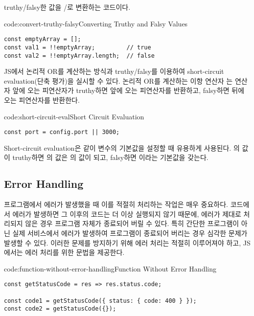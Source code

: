 \는 truthy/falsy한 값을 /로 변환하는 코드이다.

\begin{codeenv}{code:convert-truthy-falsy}{Converting Truthy and Falsy Values}\begin{verbatim}
const emptyArray = [];
const val1 = !!emptyArray;         // true
const val2 = !!emptyArray.length;  // false
\end{verbatim}
\end{codeenv}

JS에서 논리적 OR를 계산하는 방식과 truthy/falsy를 이용하여 short-circuit evaluation(단축 평가)을 실시할 수 있다. 논리적 OR를 계산하는 이항 연산자 \cd{||}는 연산자 앞에 오는 피연산자가 truthy하면 앞에 오는 피연산자를 반환하고, falsy하면 뒤에 오는 피연산자를 반환한다.

\begin{codeenv}{code:short-circuit-eval}{Short Circuit Evaluation}\begin{verbatim}
const port = config.port || 3000;
\end{verbatim}
\end{codeenv}

Short-circuit evaluation은 \과 같이 변수의 기본값을 설정할 때 유용하게 사용된다. 의 값이 truthy하면 의 값은 의 값이 되고, falsy하면 이라는 기본값을 갖는다.
\clearpage

\subsection*{Error Handling}

프로그램에서 에러가 발생했을 때 이를 적절히 처리하는 작업은 매우 중요하다. 코드에서 에러가 발생하면 그 이후의 코드는 더 이상 실행되지 않기 때문에, 에러가 제대로 처리되지 않은 경우 프로그램 자체가 종료되어 버릴 수 있다. 특히 간단한 프로그램이 아닌 실제 서비스에서 에러가 발생하여 프로그램이 종료되어 버리는 경우 심각한 문제가 발생할 수 있다. 이러한 문제를 방지하기 위해 에러 처리는 적절히 이루어져야 하고, JS에서는 에러 처리를 위한 문법을 제공한다.

\begin{codeenv}{code:function-without-error-handling}{Function Without Error Handling}\begin{verbatim}
const getStatusCode = res => res.status.code;

const code1 = getStatusCode({ status: { code: 400 } });
const code2 = getStatusCode({});
\end{verbatim}
\end{codeenv}

